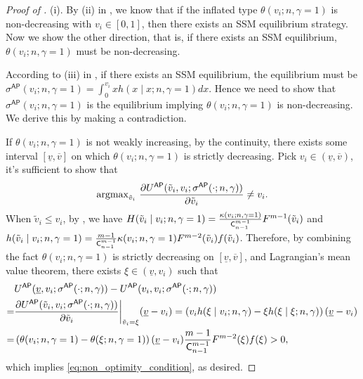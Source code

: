\begin{proof}[{Proof of }] (i). By (ii) in , we know that if the inflated type $\theta(v_i;n,\gamma = 1)$ is non-decreasing with $v_i \in [0,1]$, then there exists an SSM equilibrium strategy. Now we show the other direction, that is, if there exists an SSM equilibrium, $\theta(v_i;n,\gamma = 1)$ must be non-decreasing.

According to (iii) in , if there exists an SSM equilibrium, the equilibrium must be $\sigma^{\mathsf{AP}}(v_i;n,\gamma = 1)
  =\int_0^{v_i} x h(x\mid x;n,\gamma = 1)dx$. Hence we need to show that $\sigma^{\mathsf{AP}}(v_i;n,\gamma = 1)$ is the equilibrium implying $\theta(v_i;n,\gamma = 1)$ is non-decreasing. We derive this by making a contradiction.

\noindent If $\theta(v_i;n,\gamma = 1)$ is not weakly increasing, by the continuity, there exists some interval $[\underline{v}, \overline{v}]$ on which $\theta(v_i;n,\gamma = 1)$ is strictly decreasing. Pick $v_i \in (\underline{v}, \overline{v})$, it's sufficient to show that 
\begin{align}\label{eq:non_optimity_condition}
    {\operatorname*{\text{argmax}}}_{\tilde{v}_i}~\frac{\partial U^{\mathsf{AP}}(\tilde{v}_i,v_i;\sigma^{\mathsf{AP}}(\cdot;n,\gamma))}{\partial \tilde{v}_i} \neq v_i.
\end{align}
When $\tilde{v}_i \leq v_i$, by  , we have $H(\tilde{v}_i \mid v_i;n,\gamma = 1) = \frac{\kappa(v_i; n, \gamma = 1)}{\mathsf{C}^{m-1}_{n-1}}F^{m-1}(\tilde{v}_i)$ and $h(\tilde{v}_i \mid v_i;n,\gamma = 1) = \frac{m-1}{\mathsf{C}^{m-1}_{n-1}}\kappa(v_i; n, \gamma = 1)F^{m-2}(\tilde{v}_i)f(\tilde{v}_i)$. Therefore, by combining the fact $\theta(v_i;n,\gamma = 1)$ is strictly decreasing on $[\underline{v}, \overline{v}]$, and Lagrangian's mean value theorem, there exists $\xi \in (\underline{v}, v_i)$ such that  
\begin{align*}
    &U^{\mathsf{AP}}(\underline{v},v_i;\sigma^{\mathsf{AP}}(\cdot;n,\gamma)) - U^{\mathsf{AP}}({v}_i,v_i;\sigma^{\mathsf{AP}}(\cdot;n,\gamma))\\
    =& \frac{\partial U^{\mathsf{AP}}(\tilde{v}_i,v_i;\sigma^{\mathsf{AP}}(\cdot;n,\gamma))}{\partial \tilde{v}_i}\bigg|_{\tilde{v}_i = \xi} (\underline{v} - v_i)
    =\left(v_ih(\xi\mid {v}_i;n, \gamma) -  \xi h(\xi \mid \xi;n, \gamma)\right)(\underline{v} - v_i)\\
    =& \left(\theta(v_i;n,\gamma = 1) - \theta(\xi;n,\gamma = 1)\right)(\underline{v} - v_i)\frac{m-1}{\mathsf{C}^{m-1}_{n-1}}F^{m-2}(\xi)f(\xi)>0,
\end{align*}
which implies \eqref{eq:non_optimity_condition}, as desired.


\end{proof}
